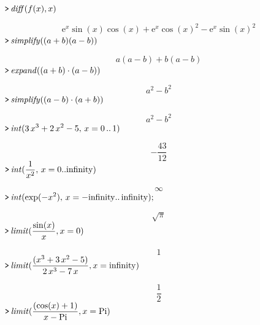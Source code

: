 \documentclass{article}
\begin{document}
\mapleinput
{$ \displaystyle \texttt{>\,} \mathit{diff} (f (x),x) $}

\begin{dmath}\label{(7)}
{\mathrm e}^{x} \sin \! \left(x \right) \cos \! \left(x \right)+{\mathrm e}^{x} \cos \! \left(x \right)^{2}-{\mathrm e}^{x} \sin \! \left(x \right)^{2}
\end{dmath}
\mapleinput
{$ \displaystyle \texttt{>\,} \mathit{simplify} ((a +b)(a -b)) $}

\begin{dmath}\label{(8)}
a \! \left(a -b \right)+b \! \left(a -b \right)
\end{dmath}
\mapleinput
{$ \displaystyle \texttt{>\,} \mathit{expand} ((a +b)\cdot (a -b)) $}

\begin{dmath}\label{(9)}
a^{2}-b^{2}
\end{dmath}
\mapleinput
{$ \displaystyle \texttt{>\,} \mathit{simplify} ((a -b)\cdot (a +b)) $}

\begin{dmath}\label{(10)}
a^{2}-b^{2}
\end{dmath}
\mapleinput
{$ \displaystyle \texttt{>\,} \mathit{int} (3\,x^{3}+2\,x^{2}-5,\,x =0\,..\,1) $}

\begin{dmath}\label{(11)}
-\frac{43}{12}
\end{dmath}
\mapleinput
{$ \displaystyle \texttt{>\,} \mathit{int} (\frac{1}{x^{2}},\,x =0..\mathrm{infinity}) $}

\begin{dmath}\label{(12)}
\infty 
\end{dmath}
\mapleinput
{$ \displaystyle \texttt{>\,} \mathit{int} (\exp (-x^{2}),\,x =-\mathrm{infinity}..\,\mathrm{infinity}); $}

\begin{dmath}\label{(13)}
\sqrt{\pi}
\end{dmath}
\mapleinput
{$ \displaystyle \texttt{>\,} \mathit{limit} (\frac{\sin (x)}{x},x =0) $}

\begin{dmath}\label{(14)}
1
\end{dmath}
\mapleinput
{$ \displaystyle \texttt{>\,} \mathit{limit} (\frac{(x^{3}+3\,x^{2}-5)}{2\,x^{3}-7\,x},x =\mathrm{infinity}) $}

\begin{dmath}\label{(15)}
\frac{1}{2}
\end{dmath}
\mapleinput
{$ \displaystyle \texttt{>\,} \mathit{limit} (\frac{(\cos (x)+1)}{x -\mathrm{Pi}},x =\mathrm{Pi}) $}
\end{document}
